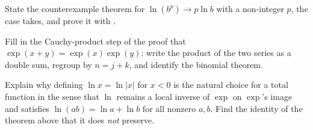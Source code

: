 \begin{exercisebox}
  State the counterexample theorem for $\ln(b^p) \to p \ln b$ with a non-integer $p$, the case
   takes, and prove it with .
\end{exercisebox}

\begin{exercisebox}
  Fill in the Cauchy-product step of the proof that $\exp(x+y) = \exp(x)\exp(y)$: write the
  product of the two series as a double sum, regroup by $n = j + k$, and identify the binomial
  theorem.
\end{exercisebox}

\begin{exercisebox}[Evenness]
  Explain why defining $\ln x = \ln |x|$ for $x < 0$ is the natural choice for a total function
  in the sense that $\ln$ remains a local inverse of $\exp$ on $\exp$'s image and satisfies
  $\ln(ab) = \ln a + \ln b$ for all nonzero $a, b$. Find the identity of the theorem above that
  it does \emph{not} preserve.
\end{exercisebox}
